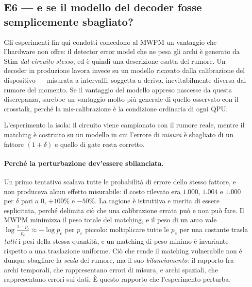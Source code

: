 \subsection[E6 --- modello del decoder errato?]{E6 --- e se il modello del decoder fosse semplicemente sbagliato?}
\label{subsec:neural_miscalibrato}

Gli esperimenti fin qui condotti concedono al \ac{MWPM} un vantaggio che l'hardware non offre: il detector error model che ne pesa gli archi è generato da Stim \emph{dal circuito stesso}, ed è quindi una descrizione esatta del rumore. Un decoder in produzione lavora invece su un modello ricavato dalla calibrazione del dispositivo --- misurata a intervalli, soggetta a deriva, inevitabilmente diversa dal rumore del momento. Se il vantaggio del modello appreso nascesse da questa discrepanza, sarebbe un vantaggio molto più generale di quello osservato con il crosstalk, perché la mis-calibrazione è la condizione ordinaria di ogni \ac{QPU}.

L'esperimento la isola: il circuito viene campionato con il rumore reale, mentre il matching è costruito su un modello in cui l'errore di \emph{misura} è sbagliato di un fattore $(1+\delta)$ e quello di gate resta corretto.

\begin{samepage}
\paragraph{Perché la perturbazione dev'essere sbilanciata.} Un primo tentativo scalava tutte le probabilità di errore dello stesso fattore, e non produceva alcun effetto misurabile: il costo rilevato era $1.000$, $1.004$ e $1.000$ per $\delta$ pari a $0$, $+100\%$ e $-50\%$. La ragione è istruttiva e merita di essere esplicitata, perché delimita ciò che una calibrazione errata può e non può fare. Il \ac{MWPM} minimizza il peso totale del matching, e il peso di un arco vale $\log\frac{1-p_e}{p_e} \approx -\log p_e$ per $p_e$ piccolo: moltiplicare tutte le $p_e$ per una costante trasla \emph{tutti} i pesi della stessa quantità, e un matching di peso minimo è invariante rispetto a una traslazione uniforme. Ciò che rende il matching vulnerabile non è dunque sbagliare la \emph{scala} del rumore, ma il suo \emph{bilanciamento}: il rapporto fra archi temporali, che rappresentano errori di misura, e archi spaziali, che rappresentano errori sui dati. È questo rapporto che l'esperimento perturba.
\end{samepage}

